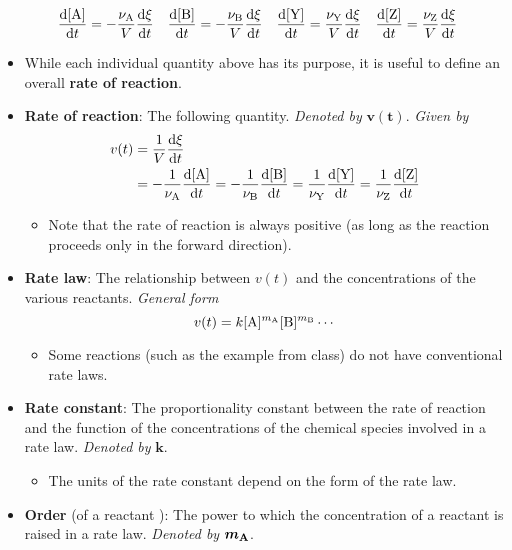 \documentclass[../notes.tex]{subfiles}
\begin{document}
\begin{itemize}
    \begin{align*}
        \dv{[\ce{A}]}{t} &= -\frac{\nu_{\ce{A}}}{V}\dv{\xi}{t}&
        \dv{[\ce{B}]}{t} &= -\frac{\nu_{\ce{B}}}{V}\dv{\xi}{t}&
        \dv{[\ce{Y}]}{t} &= \frac{\nu_{\ce{Y}}}{V}\dv{\xi}{t}&
        \dv{[\ce{Z}]}{t} &= \frac{\nu_{\ce{Z}}}{V}\dv{\xi}{t}
    \end{align*}
    \item While each individual quantity above has its purpose, it is useful to define an overall \textbf{rate of reaction}.
    \item \textbf{Rate of reaction}: The following quantity. \emph{Denoted by} $\bm{v(t)}$. \emph{Given by}
    \begin{align*}
        v(t) &= \frac{1}{V}\dv{\xi}{t}\\
        &= -\frac{1}{\nu_{\ce{A}}}\dv{[\ce{A}]}{t}
            = -\frac{1}{\nu_{\ce{B}}}\dv{[\ce{B}]}{t}
            = \frac{1}{\nu_{\ce{Y}}}\dv{[\ce{Y}]}{t}
            = \frac{1}{\nu_{\ce{Z}}}\dv{[\ce{Z}]}{t}
    \end{align*}
    \begin{itemize}
        \item Note that the rate of reaction is always positive (as long as the reaction proceeds only in the forward direction).
    \end{itemize}
    \item \textbf{Rate law}: The relationship between $v(t)$ and the concentrations of the various reactants. \emph{General form}
    \begin{equation*}
        v(t) = k[\ce{A}]^{m_{\ce{A}}}[\ce{B}]^{m_{\ce{B}}}\cdots
    \end{equation*}
    \begin{itemize}
        \item Some reactions (such as the  example from class) do not have conventional rate laws.
    \end{itemize}
    \item \textbf{Rate constant}: The proportionality constant between the rate of reaction and the function of the concentrations of the chemical species involved in a rate law. \emph{Denoted by} $\bm{k}$.
    \begin{itemize}
        \item The units of the rate constant depend on the form of the rate law.
    \end{itemize}
    \item \textbf{Order} (of a reactant ): The power to which the concentration of a reactant is raised in a rate law. \emph{Denoted by} $\bm{m_{\ce{A}}}$.

\end{itemize}
\end{document}
